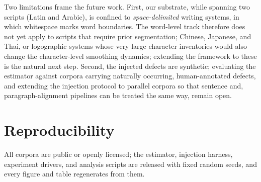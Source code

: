 \documentclass[conference]{IEEEtran}
\begin{document}
Two limitations frame the future work. First, our substrate, while spanning two
scripts (Latin and Arabic), is confined to \emph{space-delimited} writing
systems, in which whitespace marks word boundaries. The word-level track
therefore does not yet apply to scripts that require prior segmentation; Chinese,
Japanese, and Thai, or logographic systems whose very large character
inventories would also change the character-level smoothing dynamics; extending
the framework to these is the natural next step. Second, the injected defects are
synthetic; evaluating the estimator against corpora carrying naturally occurring,
human-annotated defects, and extending the injection protocol to parallel corpora
so that sentence and, paragraph-alignment pipelines can be treated the same way,
remain open.

\section*{Reproducibility}
All corpora are public or openly licensed; the estimator, injection harness,
experiment drivers, and analysis scripts are released with fixed random seeds, and
every figure and table regenerates from them.



\end{document}
